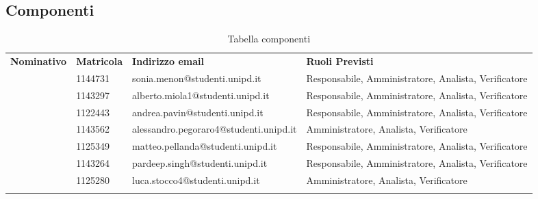 \begin{appendix}
\subsection{Componenti}
\begin{center}
	\renewcommand{\arraystretch}{1.5}
	\begin{longtable}[H]{  p{2.3cm}  p{2cm} p{6.4cm}  p{3cm}  }
		\rowcolor{tableHeadYellow}
		\textbf{Nominativo}   & \textbf{Matricola} & \textbf{Indirizzo email} & \textbf{Ruoli Previsti}\\ 
		\sonia & 1144731 & sonia.menon@studenti.unipd.it & Responsabile, \mbox{Amministratore}, Analista, Verificatore\\
		\alberto & 1143297 & alberto.miola1@studenti.unipd.it & Responsabile, \mbox{Amministratore}, Analista, Verificatore\\
		\andrea & 1122443 & andrea.pavin@studenti.unipd.it & Responsabile, \mbox{Amministratore}, Analista, Verificatore\\
		\alessandro & 1143562 & alessandro.pegoraro4@studenti.unipd.it & Amministratore, Analista, Verificatore\\
		\matteo & 1125349 & matteo.pellanda@studenti.unipd.it & Responsabile, \mbox{Amministratore}, Analista, Verificatore\\
		\pardeep & 1143264 & pardeep.singh@studenti.unipd.it & Responsabile, \mbox{Amministratore}, Analista, Verificatore\\
		\luca & 1125280 & luca.stocco4@studenti.unipd.it & \mbox{Amministratore}, Analista, Verificatore\\
		\rowcolor{white}
		\caption{Tabella componenti}
	\end{longtable}
\end{center}
\end{appendix}
